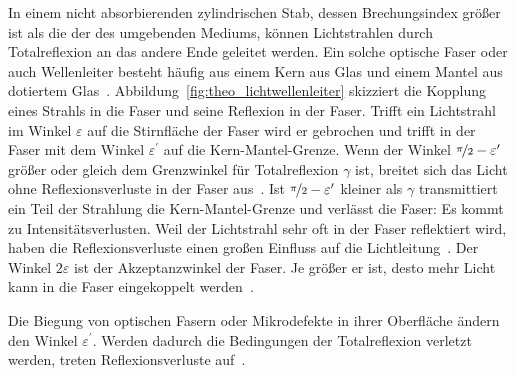 \documentclass[a4paper,12pt,twoside,parskip=no,headsepline,open=right,ngerman,export]{scrreprt}
\begin{document}
            In einem nicht absorbierenden zylindrischen Stab, dessen Brechungsindex größer ist als die der des umgebenden Mediums, können Lichtstrahlen durch Totalreflexion an das andere Ende geleitet werden. Ein solche optische Faser oder auch Wellenleiter besteht häufig aus einem Kern aus Glas und einem Mantel aus dotiertem Glas~\cite{pedrotti_optik_2005}. Abbildung~\ref{fig:theo_lichtwellenleiter} skizziert die Kopplung eines Strahls in die Faser und seine Reflexion in der Faser. Trifft ein Lichtstrahl im Winkel $\varepsilon$ auf die Stirnfläche der Faser wird er gebrochen und trifft in der Faser mit dem Winkel $\varepsilon^\prime$ auf die Kern-Mantel-Grenze. Wenn der Winkel $\nicefrac{\pi}{2} - \varepsilon^\prime$ größer oder gleich dem Grenzwinkel für Totalreflexion $\gamma$ ist, breitet sich das Licht ohne Reflexionsverluste in der Faser aus~\cite{pedrotti_optik_2005}. Ist $\nicefrac{\pi}{2} - \varepsilon^\prime$ kleiner als $\gamma$ transmittiert ein Teil der Strahlung die Kern-Mantel-Grenze und verlässt die Faser: Es kommt zu Intensitätsverlusten. Weil der Lichtstrahl sehr oft in der Faser reflektiert wird, haben die Reflexionsverluste einen großen Einfluss auf die Lichtleitung~\cite{pedrotti_optik_2005}. Der Winkel $2\varepsilon$ ist der Akzeptanzwinkel der Faser. Je größer er ist, desto mehr Licht kann in die Faser eingekoppelt werden~\cite{pedrotti_optik_2005}.
            
            Die Biegung von optischen Fasern oder Mikrodefekte in ihrer Oberfläche ändern den Winkel $\varepsilon^\prime$. Werden dadurch die Bedingungen der Totalreflexion verletzt werden, treten Reflexionsverluste auf~\cite{pedrotti_optik_2005}.
            
\end{document}
